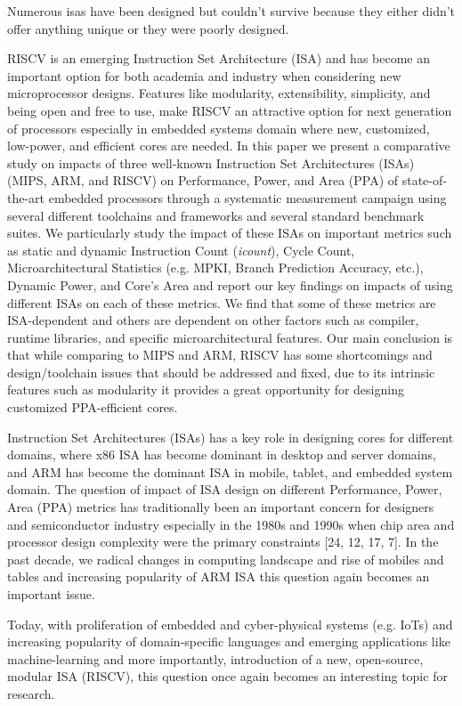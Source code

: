 
Numerous isas have been designed but couldn’t survive because they either didn’t offer anything unique or they were poorly designed.

RISCV is an emerging Instruction Set Architecture (ISA) and has become an important option for both academia and industry when considering new microprocessor designs. Features like modularity, extensibility, simplicity, and being open and free to use, make RISCV an attractive option for next generation of processors especially in embedded systems domain where new, customized, low-power, and efficient cores are needed.  In this paper we present a comparative study on impacts of three well-known Instruction Set Architectures (ISAs) (MIPS, ARM, and RISCV) on Performance, Power, and Area (PPA) of state-of-the-art embedded processors through a systematic measurement campaign using several different toolchains and frameworks and several standard benchmark suites.  We particularly study the impact of these ISAs on important metrics such as static and dynamic Instruction Count (\textit{icount}), Cycle Count, Microarchitectural Statistics (e.g. MPKI, Branch Prediction Accuracy, etc.), Dynamic Power, and Core's Area and report our key findings on impacts of using different ISAs on each of these metrics. We find that some of these metrics are ISA-dependent and others are dependent on other factors such as compiler, runtime libraries, and specific microarchitectural features. Our main conclusion is that while comparing to MIPS and ARM, RISCV has some shortcomings and design/toolchain issues that should be addressed and fixed, due to its intrinsic features such as modularity it provides a great opportunity for designing customized PPA-efficient cores.   

Instruction Set Architectures (ISAs) has a key role in designing cores for different domains, where x86 ISA has become dominant in desktop and server domains, and ARM has become the dominant ISA in mobile, tablet, and embedded system domain. The question of impact of ISA design on different Performance, Power, Area (PPA) metrics has traditionally been an important concern for designers and semiconductor industry especially in the 1980s and 1990s when
chip area and processor design complexity were the primary
constraints [24, 12, 17, 7]. In the past decade, we radical changes in computing landscape and rise of mobiles and tables and increasing popularity of ARM ISA this question again becomes an important issue. 

Today, with proliferation of embedded and cyber-physical systems (e.g. IoTs) and increasing popularity of domain-specific languages and emerging applications like machine-learning and more importantly, introduction of a new, open-source, modular ISA (RISCV), this question once again becomes an interesting topic for research. 

